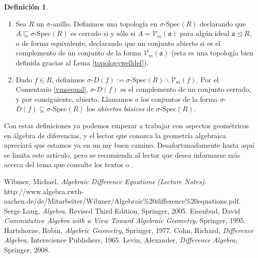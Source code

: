 \documentclass[letterpaper]{article}
\def\sSpec{\sigma\text{-Spec}}
\def\Vm{\mathcal{V}_m}
\def\a{\mathfrak{a}}
\def\s{\sigma}
\theoremstyle{definition}
\newtheorem{defn}[Satz]{Definici\'on}
\begin{document}
\begin{defn} $\phantom{}$

\begin{enumerate}
\item Sea $R$ un $\sigma$-anillo. Definimos una topolog\'ia en $\sSpec(R)$ declarando que $A \subseteq \sSpec(R)$ es cerrado si y s\'olo si $A = \Vm(\a)$ para alg\'un ideal $\a \unlhd R$, o de forma equivalente,
 declarando que un conjunto abierto si es el complemento de un conjunto de la forma $\Vm(\a)$ (esta es una topolog\'ia bien definida gracias al Lema \ref{topologywelldef}).
\item Dado $f \in R$, definimos $\sigma$-$D(f):= \sSpec(R) \backslash \Vm(f)$. Por el Comentario \ref{vmsequal}, $\s$-$D(f)$ es el complemento de un conjunto cerrado, y por consiguiente, abierto.
Llamamos a los conjuntos de la forma $\s$-$D(f) \subseteq \sSpec(R)$ los \emph{abiertos b\'asicos} de $\sSpec(R)$.
\end{enumerate}
\end{defn}

Con estas definiciones ya podemos empezar a trabajar con aspectos geom\'etricos en \'algebra de diferencias, y el lector que conozca la geometr\'ia algebraica apreciar\'a que estamos ya en un my buen camino.
Desafortunadamente hasta aqu\'i se limita este art\'iculo, pero se recomienda al lector que desea informarse m\'as acerca del tema que consulte los textos \cite{cohn} o \cite{levin}.


\begin{thebibliography}{9}
 Wibmer, Michael, \emph{Algebraic Difference Equations (Lecture Notes)}. http://www.algebra.rwth-aachen.de/de/Mitarbeiter/Wibmer/Algebraic\%20difference\%20equations.pdf.
 Serge Lang, \emph{Algebra}, Revised Third Edition, Springer, 2005.
 Eisenbud, David \emph{Commutative Algebra with a View Toward Algebraic Geometry}, Springer, 1995.
 Hartshorne, Robin, \emph{Algebric Geometry}, Springer, 1977.
 Cohn,  Richard, \emph{Difference Algebra}, Interscience Publishers, 1965.
 Levin, Alexander, \emph{Difference Algebra}, Springer, 2008.
\end{thebibliography}
\end{document}
